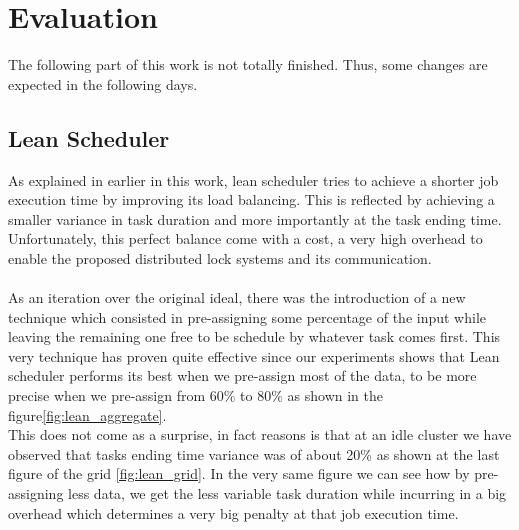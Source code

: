 \section{Evaluation}

The following part of this work is not totally finished. Thus, some changes are
expected in the following days.

\subsection{Lean Scheduler}

As explained in earlier in this work, lean scheduler tries to achieve a shorter
job execution time by improving its load balancing. This is reflected by
achieving a smaller variance in task duration and more importantly at the task
ending time. Unfortunately, this perfect balance come with a cost, a very high
overhead to enable the proposed distributed lock systems and its communication.
\\ \\

As an iteration over the original ideal, there was the introduction of a new
technique which consisted in pre-assigning some percentage of the input while
leaving the remaining one free to be schedule by whatever task comes first.
This very technique has proven quite effective since our experiments shows that
Lean scheduler performs its best when we pre-assign most of the data, to be
more precise when we pre-assign from  $60\%$ to $80\%$ as shown in the
figure\ref{fig:lean_aggregate}.  \\

This does not come as a surprise, in fact reasons is that at an idle cluster we
have observed that tasks ending time variance was of about 20\% as shown at the
last figure of the grid \ref{fig:lean_grid}. In the very same figure we can see
how by pre-assigning less data, we get the less variable task duration while
incurring in a big overhead which determines a very big penalty at that job
execution time.

